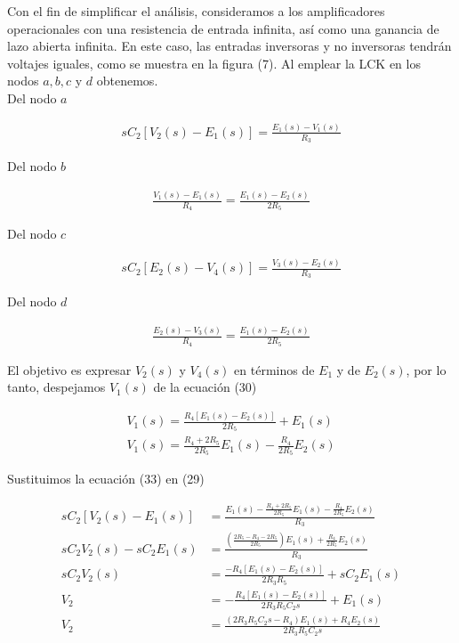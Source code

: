 \documentclass{article}
\begin{document}
Con el fin de simplificar el análisis, consideramos a los amplificadores operacionales con una resistencia de entrada infinita, así como una ganancia de lazo abierta infinita. En este caso, las entradas inversoras y no inversoras tendrán voltajes iguales, como se muestra en la figura (7). Al emplear la LCK en los nodos $a, b, c$ y $d$ obtenemos. \\

Del nodo $a$

\begin{align}
	sC_2 \left[  V_2(s) - E_1(s) \right] = \frac{E_1(s) - V_1(s)}{R_3}
\end{align}

Del nodo $b$

\begin{align}
	\frac{V_1(s) - E_1(s)}{R_4} = \frac{E_1(s) - E_2(s)}{2R_5}
\end{align}

Del nodo $c$

\begin{align}
	sC_2 \left[ E_2(s) - V_4(s) \right] = \frac{V_3(s) - E_2(s)}{R_3}
\end{align}

Del nodo $d$

\begin{align}
	\frac{E_2(s) - V_3(s)}{R_4} = \frac{E_1(s) - E_2(s)}{2R_5}
\end{align}

El objetivo es expresar $V_2(s)$ y $V_4(s)$ en términos de $E_1$ y de $E_2(s)$, por lo tanto, despejamos $V_1(s)$ de la ecuación (30)

\begin{align}
	V_1(s) = \frac{R_4 \left[ E_1(s) - E_2(s) \right]}{2R_5} + E_1(s) \nonumber \\
	V_1(s) = \frac{R_4 + 2R_5}{2R_5}E_1(s) - \frac{R_4}{2R_5}E_2(s)
\end{align}

Sustituimos la ecuación (33) en (29)

\begin{align}
	sC_2 \left[ V_2(s) - E_1(s) \right] &= \frac{ E_1(s) - \frac{R_4 + 2R_5}{2R_5}E_1(s) - \frac{R_4}{2R_5}E_2(s) }{R_3} \nonumber \\
	sC_2V_2(s) - sC_2E_1(s) &= \frac{ \left(  \frac{2R_5 - R_4 - 2R_5}{2R_5} \right) E_1(s) + \frac{R_4}{2R_5}E_2(s) }{R_3} \nonumber \\
	sC_2V_2(s) &= \frac{ -R_4 \left[ E_1(s) - E_2(s) \right] }{2R_3R_5} + sC_2E_1(s) \nonumber \\
	V_2 &= -\frac{R_4 \left[ E_1(s) - E_2(s) \right] }{2R_3R_5C_2s} + E_1(s) \nonumber \\
	V_2 &= \frac{ (2R_3R_5C_2s - R_4)E_1(s) + R_4E_2(s) }{2R_3R_5C_2s}
\end{align}
\end{document}

